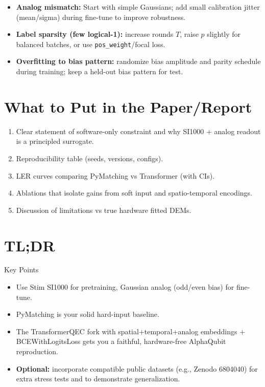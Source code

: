 \documentclass[12pt]{article}
\begin{document}
\begin{itemize}
    \item \textbf{Analog mismatch:} Start with simple Gaussians; add small calibration jitter (mean/sigma) during fine-tune to improve robustness.
    \item \textbf{Label sparsity (few logical-1):} increase rounds $T$, raise $p$ slightly for balanced batches, or use \texttt{pos\_weight}/focal loss.
    \item \textbf{Overfitting to bias pattern:} randomize bias amplitude and parity schedule during training; keep a held-out bias pattern for test.
\end{itemize}

\section{What to Put in the Paper/Report}

\begin{enumerate}
    \item Clear statement of software-only constraint and why SI1000 + analog readout is a principled surrogate.
    \item Reproducibility table (seeds, versions, configs).
    \item LER curves comparing PyMatching vs Transformer (with CIs).
    \item Ablations that isolate gains from soft input and spatio-temporal encodings.
    \item Discussion of limitations vs true hardware fitted DEMs.
\end{enumerate}

\section{TL;DR}

\begin{callout}{Key Points}
\begin{itemize}
    \item Use Stim SI1000 for pretraining, Gaussian analog (odd/even bias) for fine-tune.
    \item PyMatching is your solid hard-input baseline.
    \item The TransformerQEC fork with spatial+temporal+analog embeddings + BCEWithLogitsLoss gets you a faithful, hardware-free AlphaQubit reproduction.
    \item \textbf{Optional:} incorporate compatible public datasets (e.g., Zenodo 6804040) for extra stress tests and to demonstrate generalization.
\end{itemize}
\end{callout}
\end{document}
